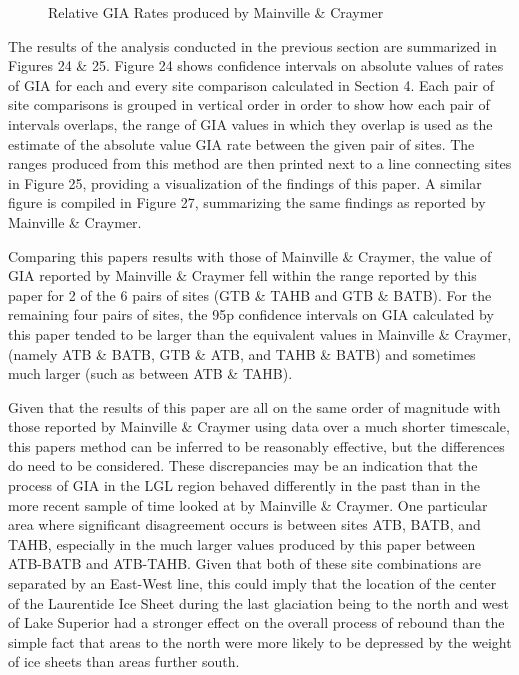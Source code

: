 \begin{figure}[h]
	\caption{Relative GIA Rates produced by Mainville \& Craymer}
	\label{fig:craymerGIARates}
\end{figure}
\newpage



The results of the analysis conducted in the previous section are summarized in
Figures 24 \& 25. Figure 24 shows confidence intervals on absolute values of
rates of GIA for each and every site comparison calculated in Section 4. Each
pair of site comparisons is grouped in vertical order in order to show how each pair
of intervals overlaps, the range of GIA values in which they overlap is used as
the estimate of the absolute value GIA rate between the given pair of sites. 
The ranges produced from this method are then printed next to a line
connecting sites in Figure 25, providing a visualization of the findings of this 
paper. A similar figure is compiled in Figure 27, summarizing the same findings
as reported by Mainville \& Craymer.

Comparing this papers results with those of Mainville \& Craymer, the value of
GIA reported by Mainville \& Craymer fell within the range reported by this paper
for 2 of the 6 pairs of sites (GTB \& TAHB and GTB \& BATB). For the remaining
four pairs of sites, the 95p confidence intervals on GIA calculated by this paper
tended to be larger than the equivalent values in Mainville \& Craymer, 
(namely ATB \& BATB, GTB \& ATB, and TAHB \& BATB) and sometimes much larger
(such as between ATB \& TAHB).

Given that the results of this paper are all on the same order of magnitude with
those reported by Mainville \& Craymer using data over a much shorter timescale,
this papers method can be inferred to be reasonably effective, but the
differences do need to be considered. These discrepancies may be an indication 
that the process of GIA in the LGL region behaved differently in the past than
in the more recent sample of time looked at by Mainville \& Craymer. One
particular area where significant
disagreement occurs is between sites ATB, BATB, and TAHB, especially in the much
larger values produced by this paper between ATB-BATB and ATB-TAHB. Given that both
of these site combinations are separated by an East-West line, this could imply
that the location of the center of the Laurentide Ice Sheet during the last glaciation being to the
north and west of Lake Superior had a stronger effect on the overall process of
rebound than the simple fact that areas to the north were more likely to be
depressed by the weight of ice sheets than areas further south. 

